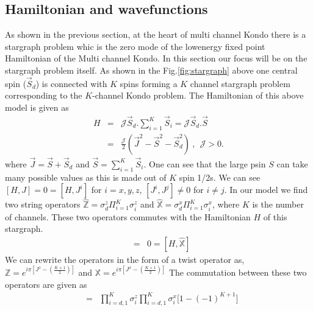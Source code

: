 \documentclass[reprint,prb,superscriptaddress]{revtex4-2}
\begin{document}
\subsection{Hamiltonian and wavefunctions}
\noindent As shown in the previous section, at the heart of multi channel Kondo there is a stargraph problem whic is the zero mode of the lowenergy fixed point Hamiltonian of the Multi channel Kondo. In this section our focus will be on the stargraph problem itself.
As shown in the Fig.\ref{fig:stargraph} above one central spin ($\vec{S}_d$) is connected with $K$ spins forming a $K$ channel stargraph problem corresponding to the $K$-channel Kondo problem. The Hamiltonian of this above model is given as 
\begin{eqnarray}
H &=& {\mathcal{J}} \vec{S}_d.\sum_{i=1}^{K}\vec{S}_i={\mathcal{J}} \vec{S}_d.\vec{S} \nonumber\\
&=& \frac{{\mathcal{J}}}{2} (\vec{J}^2-\vec{S}^2-\vec{S}_d^2)~,~~{\mathcal{J}} >0.
\label{eq:stargraph_hamiltonian}
\end{eqnarray}
where $\vec{J}=\vec{S}+\vec{S}_d$ and $\vec{S}=\sum_{i=1}^{K} \vec{S}_i$. One can see that the large psin $S$ can take many possible values as this is made out of $K$ spin 1/2s. We can see $[H,J]=0=[H,J^i]$ for  $i=x,y,z$, $[J^i,J^j]\neq 0$ for $i\neq j$. In our model we find two string operators $\hat{\mathbb{Z}}=\sigma_d^z\Pi_{i=1}^{K} \sigma_i^z$ and $\hat{\mathbb{X}}=\sigma_d^x\Pi_{i=1}^{K} \sigma_i^x$, where $K$ is the number of channels. These two operators commutes with the Hamiltonian $H$ of this stargraph.
\begin{eqnarray}
[H,\hat{\mathbb{Z}}] &=& 0 = [H,\hat{\mathbb{X}}]
\end{eqnarray}
We can rewrite the operators in the form of a twist operator as, $\mathbb{Z}=e^{i\pi [J^z-(\frac{K+1}{2})]}$ and $\mathbb{X}=e^{i\pi [J^x-(\frac{K+1}{2})]}$
The commutation between these two operators are given as
\begin{eqnarray}
[\mathbb{Z},\mathbb{X}] &=& \prod_{i=d,1}^{K} \sigma^z_{i} \prod_{i=d,1}^{K} \sigma^x_{i} \bigg[1-(-1)^{K+1}\bigg]
\end{eqnarray}
\end{document}
